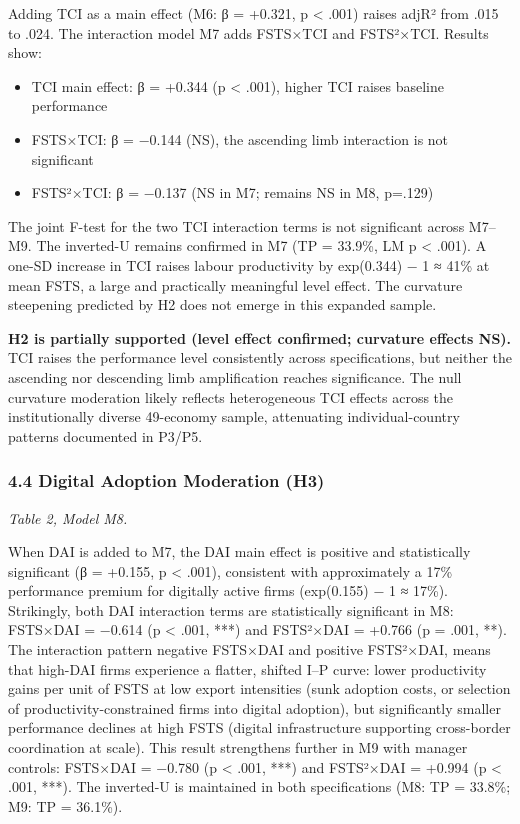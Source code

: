 \documentclass[
  12pt,a4paper]{article}
\providecommand{\tightlist}{%
  \setlength{\itemsep}{0pt}\setlength{\parskip}{0pt}}
\begin{document}
Adding TCI as a main effect (M6: β = +0.321, p \textless{} .001) raises
adjR² from .015 to .024. The interaction model M7 adds FSTS×TCI and
FSTS²×TCI. Results show:

\begin{itemize}
\tightlist
\item
  TCI main effect: β = +0.344 (p \textless{} .001), higher TCI raises
  baseline performance
\item
  FSTS×TCI: β = −0.144 (NS), the ascending limb interaction is not
  significant
\item
  FSTS²×TCI: β = −0.137 (NS in M7; remains NS in M8, p=.129)
\end{itemize}

The joint F-test for the two TCI interaction terms is not significant
across M7--M9. The inverted-U remains confirmed in M7 (TP = 33.9\%, LM p
\textless{} .001). A one-SD increase in TCI raises labour productivity
by exp(0.344) − 1 ≈ 41\% at mean FSTS, a large and practically
meaningful level effect. The curvature steepening predicted by H2 does
not emerge in this expanded sample.

\textbf{H2 is partially supported (level effect confirmed; curvature
effects NS).} TCI raises the performance level consistently across
specifications, but neither the ascending nor descending limb
amplification reaches significance. The null curvature moderation likely
reflects heterogeneous TCI effects across the institutionally diverse
49-economy sample, attenuating individual-country patterns documented in
P3/P5.

\hypertarget{digital-adoption-moderation-h3}{%
\subsubsection{4.4 Digital Adoption Moderation
(H3)}\label{digital-adoption-moderation-h3}}

\emph{Table 2, Model M8.}

When DAI is added to M7, the DAI main effect is positive and
statistically significant (β = +0.155, p \textless{} .001), consistent
with approximately a 17\% performance premium for digitally active firms
(exp(0.155) − 1 ≈ 17\%). Strikingly, both DAI interaction terms are
statistically significant in M8: FSTS×DAI = −0.614 (p \textless{} .001,
***) and FSTS²×DAI = +0.766 (p = .001, **). The interaction pattern
negative FSTS×DAI and positive FSTS²×DAI, means that high-DAI firms
experience a flatter, shifted I--P curve: lower productivity gains per
unit of FSTS at low export intensities (sunk adoption costs, or
selection of productivity-constrained firms into digital adoption), but
significantly smaller performance declines at high FSTS (digital
infrastructure supporting cross-border coordination at scale). This
result strengthens further in M9 with manager controls: FSTS×DAI =
−0.780 (p \textless{} .001, ***) and FSTS²×DAI = +0.994 (p \textless{}
.001, ***). The inverted-U is maintained in both specifications (M8: TP
= 33.8\%; M9: TP = 36.1\%).
\end{document}
